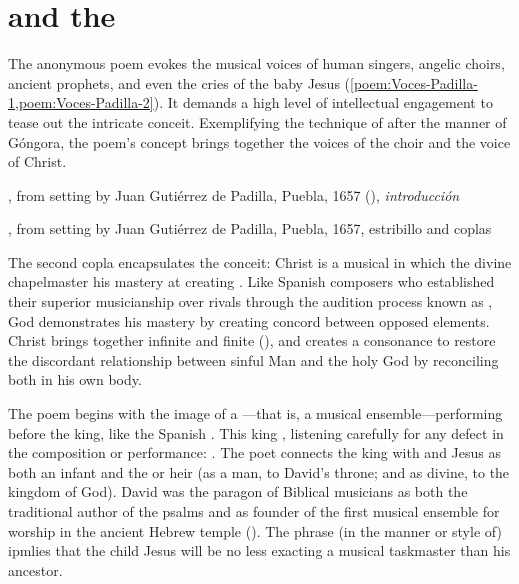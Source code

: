\section{ and the }

The anonymous poem evokes the musical voices of human singers, angelic choirs,
ancient prophets, and even the cries of the baby Jesus
(\cref{poem:Voces-Padilla-1,poem:Voces-Padilla-2}).%
    \Autocite[37--38, 119--132]{Cashner:WLSCM32}
It demands a high level of intellectual engagement to tease out the intricate
conceit.
Exemplifying the technique of  after the manner of Góngora,
the poem's concept brings together the voices of the choir and the voice of
Christ.

{, from setting by Juan Gutiérrez
de Padilla, Puebla, 1657 (), \emph{introducción}}

{, from setting by Juan Gutiérrez de Padilla,
Puebla, 1657, estribillo and coplas}

The second copla encapsulates the conceit: Christ is a musical
 in which the divine chapelmaster  his
mastery at creating .
Like Spanish composers who established their superior musicianship over rivals
through the audition process known as , God demonstrates his
mastery by creating concord between opposed elements.
Christ brings together infinite and finite (), and
creates a consonance to restore the discordant relationship between sinful Man
and the holy God by reconciling both in his own body.

The poem begins with the image of a ---that is, a musical
ensemble---performing before the king, like the Spanish .
This king , listening carefully for any defect in the
composition or performance: .
The poet connects the king with  and Jesus
as both an infant and the  or heir (as a man, to David's throne;
and as divine, to the kingdom of God).
David was the paragon of Biblical musicians as both the traditional author of
the psalms and as founder of the first musical ensemble for worship in the
ancient Hebrew temple ().
The phrase  (in the manner or style of) ipmlies that the
child Jesus will be no less exacting a musical taskmaster than his ancestor.

